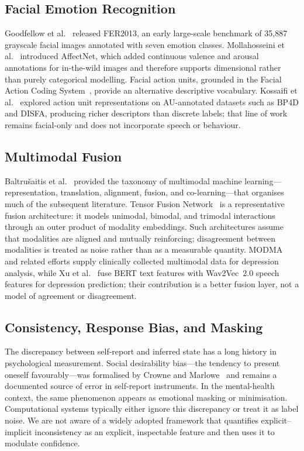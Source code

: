 \documentclass[12pt]{article}
\begin{document}
\subsection{Facial Emotion Recognition}

Goodfellow et al.~\cite{goodfellow2013fer} released FER2013, an early
large-scale benchmark of 35{,}887 grayscale facial images annotated with
seven emotion classes. Mollahosseini et
al.~\cite{mollahosseini2017affectnet} introduced AffectNet, which added
continuous valence and arousal annotations for in-the-wild images and
therefore supports dimensional rather than purely categorical modelling.
Facial action units, grounded in the Facial Action Coding
System~\cite{ekman1978facs}, provide an alternative descriptive
vocabulary. Kossaifi et al.~\cite{kossaifi2019action} explored action
unit representations on AU-annotated datasets such as BP4D and DISFA,
producing richer descriptors than discrete labels; that line of work
remains facial-only and does not incorporate speech or behaviour.

\subsection{Multimodal Fusion}

Baltru\v{s}aitis et al.~\cite{baltrusaitis2018multimodal} provided the
taxonomy of multimodal machine learning---representation, translation,
alignment, fusion, and co-learning---that organises much of the
subsequent literature. Tensor Fusion Network~\cite{zadeh2017tensor} is a
representative fusion architecture: it models unimodal, bimodal, and
trimodal interactions through an outer product of modality embeddings.
Such architectures assume that modalities are aligned and mutually
reinforcing; disagreement between modalities is treated as noise rather
than as a measurable quantity. MODMA~\cite{liu2022modma} and
related efforts supply clinically collected multimodal data for
depression analysis, while Xu et al.~\cite{xu2025multimodal} fuse BERT
text features with Wav2Vec~2.0 speech features for depression
prediction; their contribution is a better fusion layer, not a model of
agreement or disagreement.

\subsection{Consistency, Response Bias, and Masking}

The discrepancy between self-report and inferred state has a long
history in psychological measurement. Social desirability
bias---the tendency to present oneself favourably---was formalised by
Crowne and Marlowe~\cite{crowne1960social} and remains a documented
source of error in self-report instruments. In the mental-health
context, the same phenomenon appears as emotional masking or
minimisation. Computational systems typically either ignore this
discrepancy or treat it as label noise. We are not aware of a widely
adopted framework that quantifies explicit--implicit inconsistency as
an explicit, inspectable feature and then uses it to modulate
confidence.
\end{document}
